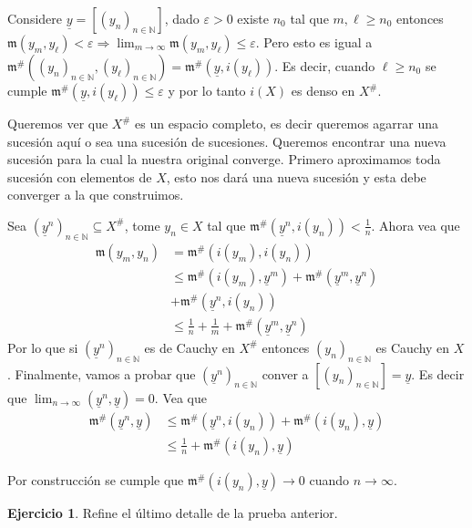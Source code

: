 \documentclass[12pt]{article}
\theoremstyle{plain}
\theoremstyle{definition}
\newtheorem{Ej}[Th]{Ejercicio}
\theoremstyle{remark}
\numberwithin{equation}{section}
\newcommand{\bN}{\mathbb{N}}        %
\newcommand{\mm}{\mathfrak{m}}      %
\renewcommand{\geq}{\geqslant}      %
\renewcommand{\leq}{\leqslant}      %
\renewcommand{\:}{\colon}           %
\newcommand{\bonj}[1]{\left\lbrack#1\right\rbrack}
\begin{document}
\begin{multicols}{2}
\begin{ptcbp}
Considere $\underline{y}=\bonj{(y_n)_{n\in\bN}}$, dado $\varepsilon>0$ existe $n_0$ tal que $m,\ell\geq n_0$ entonces $\mm(y_m,y_\ell)<\varepsilon \Rightarrow \lim_{m\to\infty}\mm(y_m,y_\ell)\leq \varepsilon$. Pero esto es igual a $\mm^\#((y_n)_{n\in\bN},(y_\ell)_{n\in\bN})=\mm^\#(\underline{y},i(y_\ell))$. Es decir, cuando $\ell\geq n_0$ se cumple $\mm^\#(\underline{y},i(y_\ell))\leq \varepsilon$ y por lo tanto $i(X)$ es denso en $X^\#$.
\end{ptcbp}

Queremos ver que $X^\#$ es un espacio completo, es decir queremos agarrar una sucesión aquí o sea una sucesión de sucesiones. Queremos encontrar una nueva sucesión para la cual la nuestra original converge. Primero aproximamos toda sucesión con elementos de $X$, esto nos dará una nueva sucesión y esta debe converger a la que construimos.

\begin{ptcbp}
Sea $(\underline{y}^n)_{n\in\bN}\subseteq X^\#$, tome $y_n\in X$ tal que $\mm^\#(\underline{y}^n,i(y_n))<\frac{1}{n}$. Ahora vea que
\begin{align*}
  \mm(y_m,y_n) & =\mm^\#(i(y_m),i(y_n)) \\
   &\leq\mm^\#(i(y_m),\underline{y}^m)+\mm^\#(\underline{y}^m,\underline{y}^n)\\
   &+\mm^\#(\underline{y}^n,i(y_n))\\
   &\leq \frac{1}{n}+\frac{1}{m}+\mm^\#(\underline{y}^m,\underline{y}^n)
\end{align*}
Por lo que si $(\underline{y}^n)_{n\in\bN}$ es de Cauchy en $X^\#$ entonces $(y_n)_{n\in\bN}$ es Cauchy en $X$. Finalmente, vamos a probar que $(\underline{y}^n)_{n\in\bN}$ conver a $\bonj{(y_n)_{n\in\bN}}=\underline{y}$. Es decir que $\lim_{n\to\infty}(\underline{y}^n,\underline{y})=0$. Vea que
\begin{align*}
  \mm^\#(\underline{y}^n,\underline{y}) &\leq \mm^\#(\underline{y}^n,i(y_n))+\mm^\#(i(y_n),\underline{y}) \\
   &\leq \frac{1}{n}+\mm^\#(i(y_n),\underline{y})
\end{align*}

Por construcción se cumple que $\mm^\#(i(y_n),\underline{y})\to 0$ cuando $n\to\infty$.
\end{ptcbp}

\begin{Ej}
  Refine el último detalle de la prueba anterior.
\end{Ej}


\end{multicols}
\end{document}

